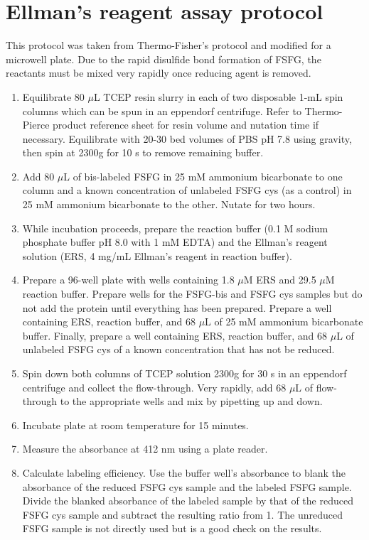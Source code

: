 \section{Ellman's reagent assay protocol}

This protocol was taken from Thermo-Fisher's protocol and modified for a microwell plate.  Due to the rapid disulfide bond formation of FSFG, the reactants must be mixed very rapidly once reducing agent is removed.

\begin{enumerate}
\item Equilibrate 80 $\mu$L TCEP resin slurry in each of two disposable 1-mL spin columns which can be spun in an eppendorf centrifuge.  Refer to Thermo-Pierce product reference sheet for resin volume and nutation time if necessary.  Equilibrate with 20-30 bed volumes of PBS pH 7.8 using gravity, then spin at 2300g for 10 s to remove remaining buffer. 
\item Add 80 $\mu$L of bis-labeled FSFG in 25 mM ammonium bicarbonate to one column and a known concentration of unlabeled FSFG cys (as a control) in 25 mM ammonium bicarbonate to the other. Nutate for two hours.
\item While incubation proceeds, prepare the reaction buffer (0.1 M sodium phosphate buffer pH 8.0 with 1 mM EDTA) and the Ellman's reagent solution (ERS, 4 mg/mL Ellman's reagent in reaction buffer).
\item Prepare a 96-well plate with wells containing 1.8 $\mu$M ERS and 29.5 $\mu$M reaction buffer.  Prepare wells for the FSFG-bis and FSFG cys samples but do not add the protein until everything has been prepared.  Prepare a well containing ERS, reaction buffer, and 68 $\mu$L of 25 mM ammonium bicarbonate buffer.  Finally, prepare a well containing ERS, reaction buffer, and 68 $\mu$L of unlabeled FSFG cys of a known concentration that has not be reduced.
\item Spin down both columns of TCEP solution 2300g for 30 s in an eppendorf centrifuge and collect the flow-through.  Very rapidly, add 68 $\mu$L of flow-through to the appropriate wells and mix by pipetting up and down.
\item Incubate plate at room temperature for 15 minutes.
\item Measure the absorbance at 412 nm using a plate reader.
\item Calculate labeling efficiency.  Use the buffer well's absorbance to blank the absorbance of the reduced FSFG cys sample and the labeled FSFG sample.  Divide the blanked absorbance of the labeled sample by that of the reduced FSFG cys sample and subtract the resulting ratio from 1.  The unreduced FSFG sample is not directly used but is a good check on the results.
\end{enumerate}